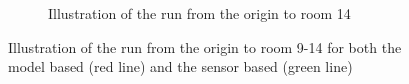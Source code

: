 \documentclass[../Head/Main.tex]{subfiles}
\begin{document}
\begin{figure}[H]
\begin{subfigure}[b]{0.49\textwidth}
    \caption{Illustration of the run from the origin to room 14}
    \label{fig:Test14}
  \end{subfigure}
  \caption{Illustration of the run from the origin to room 9-14 for both the model based (red line) and the sensor based (green line)}
\end{figure}
\end{document}
